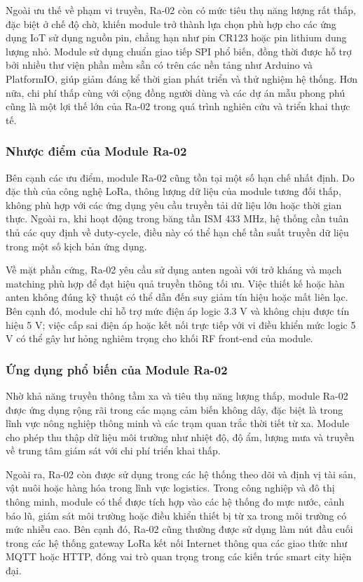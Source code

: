 \documentclass{article}
\begin{document}
	Ngoài ưu thế về phạm vi truyền, Ra-02 còn có mức tiêu thụ năng lượng rất thấp, đặc biệt ở chế độ chờ, khiến module trở thành lựa chọn phù hợp cho các ứng dụng IoT sử dụng nguồn pin, chẳng hạn như pin CR123 hoặc pin lithium dung lượng nhỏ. Module sử dụng chuẩn giao tiếp SPI phổ biến, đồng thời được hỗ trợ bởi nhiều thư viện phần mềm sẵn có trên các nền tảng như Arduino và PlatformIO, giúp giảm đáng kể thời gian phát triển và thử nghiệm hệ thống. Hơn nữa, chi phí thấp cùng với cộng đồng người dùng và các dự án mẫu phong phú cũng là một lợi thế lớn của Ra-02 trong quá trình nghiên cứu và triển khai thực tế.
	
	\subsubsection{Nhược điểm của Module Ra-02}
	
	Bên cạnh các ưu điểm, module Ra-02 cũng tồn tại một số hạn chế nhất định. Do đặc thù của công nghệ LoRa, thông lượng dữ liệu của module tương đối thấp, không phù hợp với các ứng dụng yêu cầu truyền tải dữ liệu lớn hoặc thời gian thực. Ngoài ra, khi hoạt động trong băng tần ISM 433 MHz, hệ thống cần tuân thủ các quy định về duty-cycle, điều này có thể hạn chế tần suất truyền dữ liệu trong một số kịch bản ứng dụng.
	
	Về mặt phần cứng, Ra-02 yêu cầu sử dụng anten ngoài với trở kháng và mạch matching phù hợp để đạt hiệu quả truyền thông tối ưu. Việc thiết kế hoặc hàn anten không đúng kỹ thuật có thể dẫn đến suy giảm tín hiệu hoặc mất liên lạc. Bên cạnh đó, module chỉ hỗ trợ mức điện áp logic 3.3 V và không chịu được tín hiệu 5 V; việc cấp sai điện áp hoặc kết nối trực tiếp với vi điều khiển mức logic 5 V có thể gây hư hỏng nghiêm trọng cho khối RF front-end của module.
	
	\subsubsection{Ứng dụng phổ biến của Module Ra-02}
	
	Nhờ khả năng truyền thông tầm xa và tiêu thụ năng lượng thấp, module Ra-02 được ứng dụng rộng rãi trong các mạng cảm biến không dây, đặc biệt là trong lĩnh vực nông nghiệp thông minh và các trạm quan trắc thời tiết từ xa. Module cho phép thu thập dữ liệu môi trường như nhiệt độ, độ ẩm, lượng mưa và truyền về trung tâm giám sát với chi phí triển khai thấp.
	
	Ngoài ra, Ra-02 còn được sử dụng trong các hệ thống theo dõi và định vị tài sản, vật nuôi hoặc hàng hóa trong lĩnh vực logistics. Trong công nghiệp và đô thị thông minh, module có thể được tích hợp vào các hệ thống đo mực nước, cảnh báo lũ, giám sát môi trường hoặc điều khiển thiết bị từ xa trong môi trường có mức nhiễu cao. Bên cạnh đó, Ra-02 cũng thường được sử dụng làm nút đầu cuối trong các hệ thống gateway LoRa kết nối Internet thông qua các giao thức như MQTT hoặc HTTP, đóng vai trò quan trọng trong các kiến trúc smart city hiện đại.
	
\end{document}
